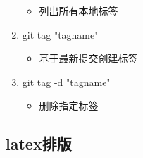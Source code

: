 \documentclass[a4paper, 12pt]{article}
\begin{document}
\begin{enumerate}
    \begin{itemize}
      \item 列出所有本地标签
    \end{itemize}
    \item {\large git tag "tagname"}
    \begin{itemize}
      \item 基于最新提交创建标签
    \end{itemize}
    \item {\large git tag -d "tagname"}
    \begin{itemize}
      \item 删除指定标签
    \end{itemize}
\end{enumerate}
\subsection{latex排版}
\end{document}
